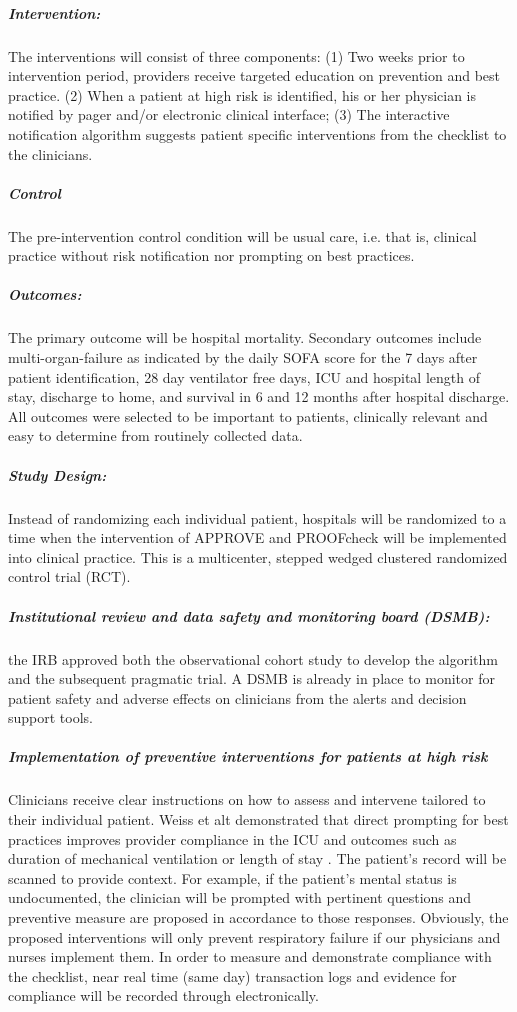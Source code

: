 \documentclass[11pt,notitlepage]{article}
\begin{document}
\subparagraph*{Intervention:}
The interventions will consist of three components: (1) Two weeks prior to intervention period, providers receive targeted education on prevention and best practice. (2)  When a patient at high risk is identified, his or her physician is notified by pager and/or electronic clinical interface; (3) The interactive notification algorithm suggests patient specific interventions from the checklist to the clinicians. 

\subparagraph*{Control}
The pre-intervention control condition will be usual care, i.e. that is, clinical practice without risk notification nor prompting on best practices.

\subparagraph*{Outcomes:}
The primary outcome will be hospital mortality. Secondary outcomes include multi-organ-failure as indicated by the daily SOFA score for the 7 days after patient identification, 28 day ventilator free days, ICU and hospital length of stay, discharge to home, and survival in 6 and 12 months after hospital discharge. All outcomes were selected to be important to patients, clinically relevant and easy to determine from routinely collected data.

\subparagraph*{Study Design:}
Instead of randomizing each individual patient, hospitals will be randomized to a time when the intervention of APPROVE and PROOFcheck will be implemented into clinical practice. This is a multicenter, stepped wedged clustered randomized control trial (RCT). 

\subparagraph*{Institutional review and data safety and monitoring board (DSMB):} the IRB approved both the observational cohort study to develop the algorithm and the subsequent pragmatic trial. A DSMB is already in place to monitor for patient safety and adverse effects on clinicians from the alerts and decision support tools.

\subparagraph*{Implementation of preventive interventions for patients at high risk}
Clinicians  receive clear instructions on how to assess and intervene tailored to their individual patient. Weiss et alt demonstrated that direct prompting for best practices improves provider compliance in the ICU and outcomes such as duration of mechanical ventilation or length of stay \cite{Weiss_21616996}. The patient's record will be scanned to provide context. For example, if the patient's mental status is undocumented, the clinician will be prompted with pertinent questions and preventive measure are proposed in accordance to those responses. Obviously, the proposed interventions will only prevent respiratory failure if our physicians and nurses implement them. In order to measure and demonstrate compliance with the checklist, near real time (same day) transaction logs and evidence for compliance will be recorded through electronically. 
\end{document}
